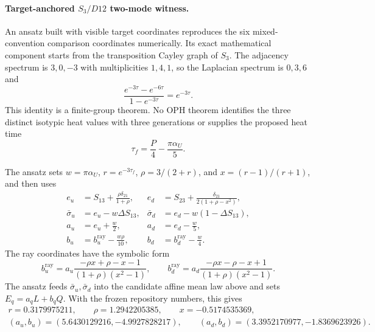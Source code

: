 \documentclass[11pt]{article}
\begin{document}
\paragraph{Target-anchored \(S_3/D12\) two-mode witness.}
An ansatz built with visible target coordinates reproduces the six mixed-convention comparison
coordinates numerically. Its exact mathematical component starts
from the transposition Cayley graph of \(S_3\).  The adjacency spectrum is
\(3,0,-3\) with multiplicities \(1,4,1\), so the Laplacian spectrum is \(0,3,6\) and
\[
\frac{e^{-3\tau}-e^{-6\tau}}{1-e^{-3\tau}}=e^{-3\tau}.
\]
This identity is a finite-group theorem. No OPH theorem identifies the three distinct
isotypic heat values with three generations or supplies the proposed heat time
\[
\tau_f=\frac P4-\frac{\pi\alpha_U}{5}.
\]

The ansatz sets \(w=\pi\alpha_U\), \(r=e^{-3\tau_f}\),
\(\rho=3/(2+r)\), and \(x=(r-1)/(r+1)\), and then uses
\[
\begin{aligned}
e_u&=S_{13}+\frac{\rho\delta_{21}}{1+\rho},&
e_d&=S_{23}+\frac{\delta_{21}}{2(1+\rho-x^2)},\\
\bar\sigma_u&=e_u-w\Delta S_{13},&
\bar\sigma_d&=e_d-w(1-\Delta S_{13}),\\
a_u&=e_u+\frac w2,&
a_d&=e_d-\frac w5,\\
b_u&=b_u^{\mathrm{ray}}-\frac{w\rho}{10},&
b_d&=b_d^{\mathrm{ray}}-\frac w4.
\end{aligned}
\]
The ray coordinates have the symbolic form
\[
b_u^{\mathrm{ray}}
=a_u\frac{-\rho x+\rho-x-1}{(1+\rho)(x^2-1)},
\qquad
b_d^{\mathrm{ray}}
=a_d\frac{-\rho x-\rho-x+1}{(1+\rho)(x^2-1)}.
\]
The ansatz feeds \(\bar\sigma_u,\bar\sigma_d\) into the candidate affine mean law above and
sets \(E_q=a_qL+b_qQ\).  With the frozen repository numbers, this gives
\[
\begin{gathered}
r=0.3179975211,\qquad \rho=1.2942205385,\qquad x=-0.5174535369,\\
(a_u,b_u)=(5.6430129216,-4.9927828217),\qquad
(a_d,b_d)=(3.3952170977,-1.8369623926).
\end{gathered}
\]
\end{document}
